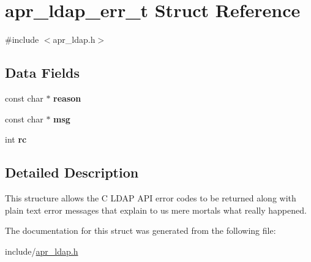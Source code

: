 \hypertarget{structapr__ldap__err__t}{\section{apr\-\_\-ldap\-\_\-err\-\_\-t Struct Reference}
\label{structapr__ldap__err__t}
}


{\ttfamily \#include $<$apr\-\_\-ldap.\-h$>$}

\subsection*{Data Fields}
\begin{DoxyCompactItemize}
\item 
\hypertarget{structapr__ldap__err__t_a3a820fdc21c35dac59bae852c0bd8b96}{const char $\ast$ {\bfseries reason}}\label{structapr__ldap__err__t_a3a820fdc21c35dac59bae852c0bd8b96}

\item 
\hypertarget{structapr__ldap__err__t_ab617f5860357450b400ae83d4a17d9f9}{const char $\ast$ {\bfseries msg}}\label{structapr__ldap__err__t_ab617f5860357450b400ae83d4a17d9f9}

\item 
\hypertarget{structapr__ldap__err__t_a0c8e5066c9fcc64524b11c598cbc12f2}{int {\bfseries rc}}\label{structapr__ldap__err__t_a0c8e5066c9fcc64524b11c598cbc12f2}

\end{DoxyCompactItemize}


\subsection{Detailed Description}
This structure allows the C L\-D\-A\-P A\-P\-I error codes to be returned along with plain text error messages that explain to us mere mortals what really happened. 

The documentation for this struct was generated from the following file\-:\begin{DoxyCompactItemize}
\item 
include/\hyperlink{apr__ldap_8h}{apr\-\_\-ldap.\-h}\end{DoxyCompactItemize}
